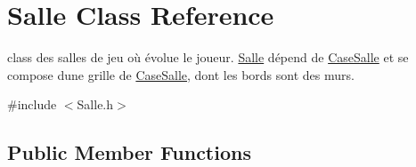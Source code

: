 \hypertarget{classSalle}{}\section{Salle Class Reference}
\label{classSalle}


class des salles de jeu où évolue le joueur. \hyperlink{classSalle}{Salle} dépend de \hyperlink{classCaseSalle}{Case\+Salle} et se compose d\textquotesingle{}une grille de \hyperlink{classCaseSalle}{Case\+Salle}, dont les bords sont des murs.  




{\ttfamily \#include $<$Salle.\+h$>$}

\subsection*{Public Member Functions}
